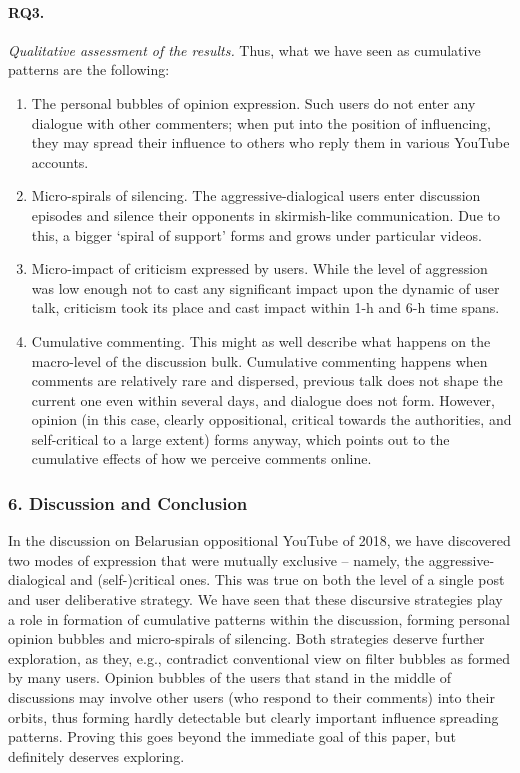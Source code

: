 \paragraph{RQ3.} \textit{Qualitative assessment of the results.} Thus, what we have seen as cumulative patterns are the following:
\begin{enumerate}
	\item The personal bubbles of opinion expression. Such users do not enter any dialogue with other commenters; when put into the position of influencing, they may spread their influence to others who reply them in various YouTube accounts.
	
	\item Micro-spirals of silencing. The aggressive-dialogical users enter discussion episodes and silence their opponents in skirmish-like communication. Due to this, a bigger ‘spiral of support’ forms and grows under particular videos.
	
	\item Micro-impact of criticism expressed by users. While the level of aggression was low enough not to cast any significant impact upon the dynamic of user talk, criticism took its place and cast impact within 1-h and 6-h time spans.
	
	\item Cumulative commenting. This might as well describe what happens on the macro-level of the discussion bulk. Cumulative commenting happens when comments are relatively rare and dispersed, previous talk does not shape the current one even within several days, and dialogue does not form. However, opinion (in this case, clearly oppositional, critical towards the authorities, and self-critical to a large extent) forms anyway, which points out to the cumulative effects of how we perceive comments online.
\end{enumerate}

\subsubsection{6. Discussion and Conclusion}

In the discussion on Belarusian oppositional YouTube of 2018, we have discovered two modes of expression that were mutually exclusive -- namely, the aggressive-dialogical and (self-)critical ones. This was true on both the level of a single post and user deliberative strategy. We have seen that these discursive strategies play a role in formation of cumulative patterns within the discussion, forming personal opinion bubbles and micro-spirals of silencing. Both strategies deserve further exploration, as they, e.g., contradict conventional view on filter bubbles as formed by many users. Opinion bubbles of the users that stand in the middle of discussions may involve other users (who respond to their comments) into their orbits, thus forming hardly detectable but clearly important influence spreading patterns. Proving this goes beyond the immediate goal of this paper, but definitely deserves exploring.

